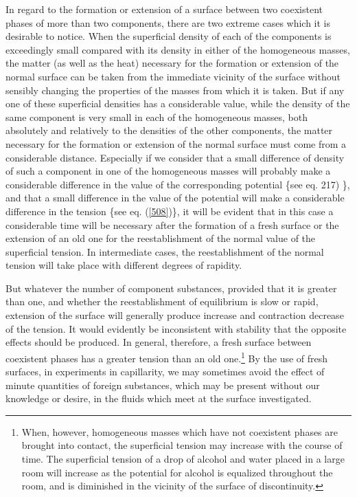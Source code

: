 \documentclass[12pt]{article}
\begin{document}
{In regard to the formation or extension of a surface between two coexistent phases of more than two components, there are two extreme cases which it is desirable to notice. When the superficial density of each of the components is exceedingly small compared with its density in either of the homogeneous masses, the matter (as well as the heat) necessary for the formation or extension of the normal surface can be taken from the immediate vicinity of the surface without sensibly changing the properties of the masses from which it is taken. But if any one of these superficial densities has a considerable value, while the density of the same component is very small in each of the homogeneous masses, both absolutely and relatively to the densities of the other components, the matter necessary for the formation or extension of the normal surface must come from a considerable distance. Especially if we consider that a small difference of density of such a component in one of the homogeneous masses will probably make a considerable difference in the value of the corresponding potential \{see eq. 217) \}, and that a small difference in the value of the potential will make a considerable difference in the tension \{see eq. (\ref{508})\}, it will be evident that in this case a considerable time will be necessary after the formation of a fresh surface or the extension of an old one for the reestablishment of the normal value of the superficial tension. In intermediate cases, the reestablishment of the normal tension will take place with different degrees of rapidity.

But whatever the number of component substances, provided that it is greater than one, and whether the reestablishment of equilibrium is slow or rapid, extension of the surface will generally produce increase and contraction decrease of the tension. It would evidently be inconsistent with stability that the opposite effects should be produced. In general, therefore, a fresh surface between coexistent phases has a greater tension than an old one.\footnote{When, however, homogeneous masses which have not coexistent phases are brought into contact, the superficial tension may increase with the course of time. The superficial tension of a drop of alcohol and water placed in a large room will increase as the potential for alcohol is equalized throughout the room, and is diminished in the vicinity of the surface of discontinuity.} 
By the use of fresh surfaces, in experiments in capillarity, we may sometimes avoid the effect of minute quantities of foreign substances, which may be present without our knowledge or desire, in the fluids which meet at the surface investigated.

}
\end{document}
